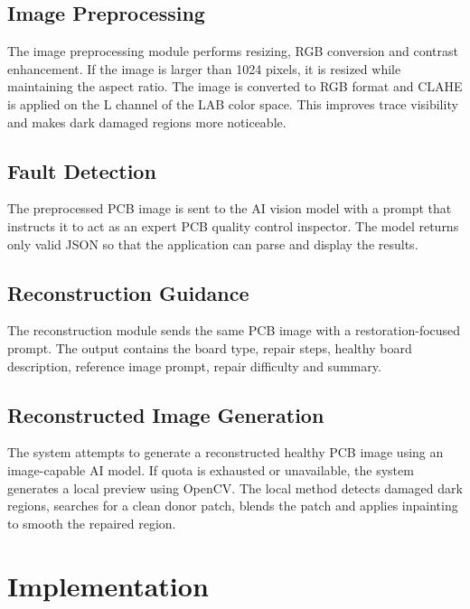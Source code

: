 \documentclass[12pt,a4paper]{report}
\begin{document}
\section{Image Preprocessing}

The image preprocessing module performs resizing, RGB conversion and contrast enhancement. If the image is larger than 1024 pixels, it is resized while maintaining the aspect ratio. The image is converted to RGB format and CLAHE is applied on the L channel of the LAB color space. This improves trace visibility and makes dark damaged regions more noticeable.

\section{Fault Detection}

The preprocessed PCB image is sent to the AI vision model with a prompt that instructs it to act as an expert PCB quality control inspector. The model returns only valid JSON so that the application can parse and display the results.

\section{Reconstruction Guidance}

The reconstruction module sends the same PCB image with a restoration-focused prompt. The output contains the board type, repair steps, healthy board description, reference image prompt, repair difficulty and summary.

\section{Reconstructed Image Generation}

The system attempts to generate a reconstructed healthy PCB image using an image-capable AI model. If quota is exhausted or unavailable, the system generates a local preview using OpenCV. The local method detects damaged dark regions, searches for a clean donor patch, blends the patch and applies inpainting to smooth the repaired region.


\chapter{Implementation}
\end{document}
